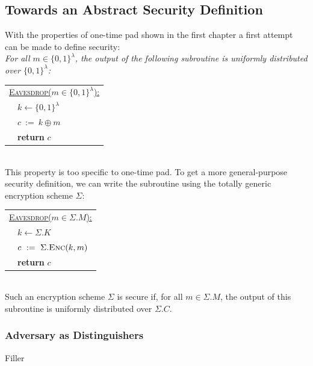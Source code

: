 \documentclass{article}
\begin{document}
\begin{adjustwidth}{2em}{}
			\subsection{Towards an Abstract Security Definition}
			\begin{adjustwidth}{2em}{4em}
				With the properties of one-time pad shown in the first chapter a first attempt can be made to define security: \\
				\textit{For all $m \in \{ 0,1 \}^{\lambda}$, the output of the following subroutine is uniformly distributed over $\{ 0,1 \}^{\lambda}$:}
				\begin{center}
					\begin{tabular}{|l|}
						\hline
						\underline{\textsc{Eavesdrop}($m \in \{ 0,1 \}^{\lambda}$):} \\
						\ \ $k \leftarrow \{ 0,1 \}^{\lambda}$ \\
						\ \ $c \ := \ k \oplus m$ \\
						\ \ \textbf{return} $c$ \\
						\hline
					\end{tabular}
				\end{center}
				\hfill \\
				This property is too specific to one-time pad. To get a more general-purpose security definition, we can write the subroutine using the totally generic encryption scheme $\Sigma$: \\
				\begin{center}
					\begin{tabular}{|l|}
						\hline
						\underline{\textsc{Eavesdrop}($m \in \Sigma.M$):} \\
						\ \ $k \leftarrow \Sigma.K$ \\
						\ \ $c \ := \ \Sigma.\textsc{Enc}(k,m)$ \\
						\ \ \textbf{return} $c$ \\
						\hline
					\end{tabular}
				\end{center}
				\hfill \\
				Such an encryption scheme $\Sigma$ is secure if, for all $m \in \Sigma.M$, the output of this subroutine is uniformly distributed over $\Sigma.C$. 
				\subsubsection{Adversary as Distinguishers}
				\begin{adjustwidth}{2em}{}
				Filler
				\end{adjustwidth}

\end{adjustwidth}
\end{adjustwidth}
\end{document}
